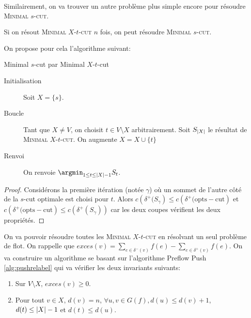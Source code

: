 \documentclass[math, info]{cours}
\begin{document}
Similairement, on va trouver un autre problème plus simple encore pour résoudre \textsc{Minimal $s$-cut}.

\begin{proposition}
	Si on résout \textsc{Minimal $X$-$t$-cut} $n$ fois, on peut résoudre \textsc{Minimal $s$-cut}.
	\label{prop:minxtcut}
\end{proposition}

On propose pour cela l'algorithme suivant:
\begin{algorithm}
	\caption{Minimal $s$-cut par Minimal $X$-$t$-cut}
	\begin{description}
		\item[Initialisation] Soit $X = \{s\}$.
		\item[Boucle] Tant que $X \neq V$, on choisit $t \in V\setminus X$ arbitrairement.
			Soit $S_{\left|X\right|}$ le résultat de \textsc{Minimal $X$-$t$-cut}.
			On augmente $X = X \cup \{t\}$
		\item[Renvoi] On renvoie $\displaystyle\argmin_{1 \leq t \leq \abs{X} - 1} S_{t}$.
	\end{description}
\end{algorithm}

\begin{proof}
	Considérons la première itération (notée $\gamma$) où un sommet de l'autre côté de la $s$-cut optimale est choisi pour $t$.
	Alors $c\left(\delta^{+}(S_{\gamma}\right) \leq c\left(\delta^{+}(\mathrm{opt s-cut}\right)$ et $c\left(\delta^{+}(\mathrm{opt s-cut}\right) \leq c(\delta^{+}(S_{\gamma}))$ car les deux coupes vérifient les deux propriétés.
\end{proof}

On va pouvoir résoudre toutes les \textsc{Minimal $X$-$t$-cut} en résolvant un seul problème de flot.
On rappelle que $exces(v) = \sum_{e \in \delta^{-}(v)} f(e) - \sum_{e \in \delta^{+}(v)} f(e)$.
On va construire un algorithme se basant sur l'algorithme Preflow Push \ref{alg:pushrelabel} qui va vérifier les deux invariants suivants:
\begin{enumerate}
	\item Sur $V \setminus X$, $exces(v) \geq 0$.
	\item Pour tout $v \in X$, $d(v) = n$, $\forall u, v \in G(f), d(u) \leq d(v) + 1$, $d(t) \leq \left|X\right| - 1$ et $d(t) \leq d(u)$.
\end{enumerate}
\end{document}
